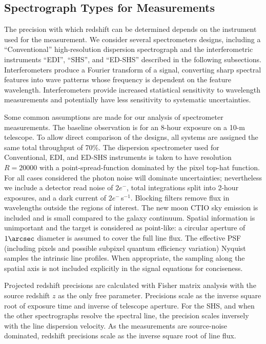 \documentclass[preprint2, 10pt]{aastex}
\begin{document}
\subsection{Spectrograph Types for Measurements} 

The precision with which redshift can be determined depends on the instrument used for the measurement.
We consider several spectrometers designs, including a ``Conventional'' high-resolution dispersion spectrograph and the
interferometric instruments ``EDI'',
``SHS'', and ``ED-SHS'' described in the following subsections.  Interferometers produce a Fourier transform of a signal, converting sharp
spectral features into wave patterns whose frequency is dependent on the feature wavelength.  Interferometers provide
increased statistical sensitivity to wavelength measurements and potentially have less sensitivity to systematic
uncertainties.

Some common assumptions are made for our analysis of spectrometer 
measurements. 
The baseline observation is for an 8-hour exposure on a 10-m telescope.
To allow direct comparison of the 
designs, all systems are assigned the same total throughput of 70\%.
The dispersion spectrometer used for Conventional, EDI, and ED-SHS instruments is taken to have resolution $R=20000$ with a 
point-spread-function dominated by the pixel top-hat function.
For all cases considered the photon noise will dominate uncertainties; nevertheless
we include a detector read noise of $2e^-$, total integrations split into 2-hour exposures, and a dark current of $2e^-$\,s$^{-1}$. 
Blocking filters remove flux in wavelengths outside the regions
of interest.  The new moon CTIO sky emission is included and
is small compared to the galaxy continuum.
Spatial information is unimportant and the target is considered as point-like: a
circular aperture of $1\arcsec$ diameter is assumed to cover the full line flux.
The effective PSF (including pixels and possible subpixel quantum efficiency variation) 
Nyquist samples the intrinsic line profiles.
When appropriate, the sampling along the spatial axis is not included explicitly in the
signal equations for conciseness.


Projected redshift precisions are calculated with Fisher matrix analysis with the source
redshift $z$ as the only free parameter. 
Precisions scale as the inverse square root of exposure time and inverse of telescope aperture. 
For the SHS, and when the other spectrographs resolve the spectral line, the precision scales 
inversely
with the line dispersion velocity.  
As the measurements
are source-noise dominated, redshift precisions scale as the inverse square 
root
of line flux. 
\end{document}
